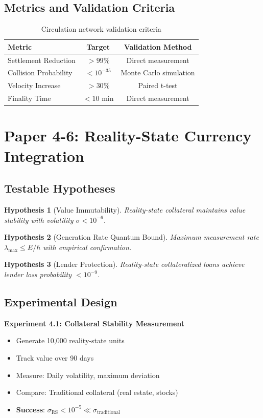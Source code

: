 \documentclass[12pt]{article}
\newtheorem{hypothesis}{Hypothesis}
\begin{document}
\subsection{Metrics and Validation Criteria}

\begin{table}[h]
\centering
\begin{tabular}{|l|c|c|}
\hline
Metric & Target & Validation Method \\
\hline
Settlement Reduction & $> 99\%$ & Direct measurement \\
Collision Probability & $< 10^{-35}$ & Monte Carlo simulation \\
Velocity Increase & $> 30\%$ & Paired t-test \\
Finality Time & $< 10$ min & Direct measurement \\
\hline
\end{tabular}
\caption{Circulation network validation criteria}
\end{table}

\section{Paper 4-6: Reality-State Currency Integration}

\subsection{Testable Hypotheses}

\begin{hypothesis}[Value Immutability]
Reality-state collateral maintains value stability with volatility $\sigma < 10^{-6}$.
\end{hypothesis}

\begin{hypothesis}[Generation Rate Quantum Bound]
Maximum measurement rate $\lambda_{\max} \leq E/\hbar$ with empirical confirmation.
\end{hypothesis}

\begin{hypothesis}[Lender Protection]
Reality-state collateralized loans achieve lender loss probability $< 10^{-9}$.
\end{hypothesis}

\subsection{Experimental Design}

\textbf{Experiment 4.1: Collateral Stability Measurement}
\begin{itemize}
    \item Generate 10,000 reality-state units
    \item Track value over 90 days
    \item Measure: Daily volatility, maximum deviation
    \item Compare: Traditional collateral (real estate, stocks)
    \item \textbf{Success}: $\sigma_{\text{RS}} < 10^{-5} \ll \sigma_{\text{traditional}}$
\end{itemize}
\end{document}
